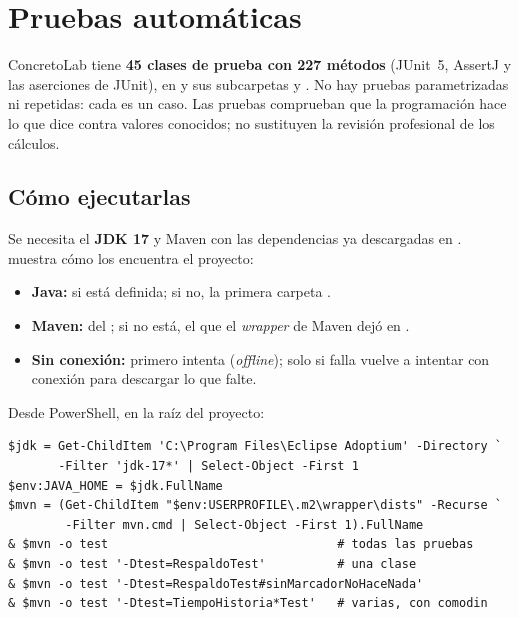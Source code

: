 \section{Pruebas automáticas}
\label{sec:pru-pruebas}

ConcretoLab tiene \textbf{45 clases de prueba con 227 métodos } (JUnit~5, AssertJ y las aserciones de
JUnit), en  y sus subcarpetas  y . No hay pruebas
parametrizadas ni repetidas: cada  es un caso. Las pruebas comprueban que la programación hace lo que dice
contra valores conocidos; no sustituyen la revisión profesional de los cálculos.

\subsection{Cómo ejecutarlas}

Se necesita el \textbf{JDK 17} y Maven con las dependencias ya descargadas en .
 muestra cómo los encuentra el proyecto:

\begin{itemize}
	\item \textbf{Java:}  si está definida; si no, la primera carpeta
	      .
	\item \textbf{Maven:}  del ; si no está, el  que el \emph{wrapper} de Maven dejó
	      en .
	\item \textbf{Sin conexión:} primero intenta  (\emph{offline}); solo si falla vuelve a intentar con
	      conexión para descargar lo que falte.
\end{itemize}

Desde PowerShell, en la raíz del proyecto:

\begin{verbatim}
$jdk = Get-ChildItem 'C:\Program Files\Eclipse Adoptium' -Directory `
       -Filter 'jdk-17*' | Select-Object -First 1
$env:JAVA_HOME = $jdk.FullName
$mvn = (Get-ChildItem "$env:USERPROFILE\.m2\wrapper\dists" -Recurse `
        -Filter mvn.cmd | Select-Object -First 1).FullName
& $mvn -o test                                # todas las pruebas
& $mvn -o test '-Dtest=RespaldoTest'          # una clase
& $mvn -o test '-Dtest=RespaldoTest#sinMarcadorNoHaceNada'
& $mvn -o test '-Dtest=TiempoHistoria*Test'   # varias, con comodin
\end{verbatim}

